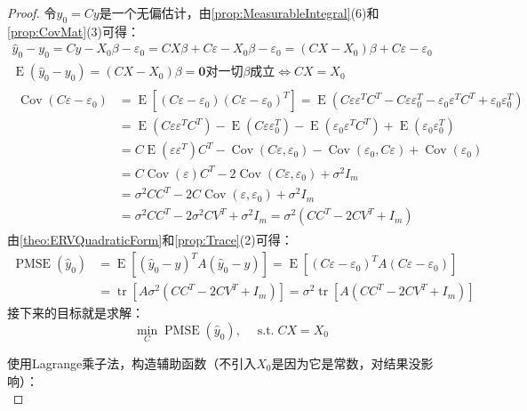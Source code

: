 \begin{proof}
	令$\hat{y}_0=Cy$是一个无偏估计，由\cref{prop:MeasurableIntegral}(6)和\cref{prop:CovMat}(3)可得：
	\begin{gather*}
		\hat{y}_0-y_0=Cy-X_0\beta-\varepsilon_0=CX\beta+C\varepsilon-X_0\beta-\varepsilon_0=(CX-X_0)\beta+C\varepsilon-\varepsilon_0 \\
		\operatorname{E}(\hat{y}_0-y_0)=(CX-X_0)\beta=\mathbf{0}\text{对一切$\beta$成立}\iff CX=X_0 \\
		\begin{aligned}
			\operatorname{Cov}(C\varepsilon-\varepsilon_0)&=\operatorname{E}[(C\varepsilon-\varepsilon_0)(C\varepsilon-\varepsilon_0)^T]=\operatorname{E}(C\varepsilon\varepsilon^TC^T-C\varepsilon\varepsilon_0^T-\varepsilon_0\varepsilon^TC^T+\varepsilon_0\varepsilon_0^T) \\
			&=\operatorname{E}(C\varepsilon\varepsilon^TC^T)-\operatorname{E}(C\varepsilon\varepsilon_0^T)-\operatorname{E}(\varepsilon_0\varepsilon^TC^T)+\operatorname{E}(\varepsilon_0\varepsilon_0^T) \\
			&=C\operatorname{E}(\varepsilon\varepsilon^T)C^T-\operatorname{Cov}(C\varepsilon,\varepsilon_0)-\operatorname{Cov}(\varepsilon_0,C\varepsilon)+\operatorname{Cov}(\varepsilon_0) \\
			&=C\operatorname{Cov}(\varepsilon)C^T-2\operatorname{Cov}(C\varepsilon,\varepsilon_0)+\sigma^2I_m \\
			&=\sigma^2CC^T-2C\operatorname{Cov}(\varepsilon,\varepsilon_0)+\sigma^2I_m \\
			&=\sigma^2CC^T-2\sigma^2CV^T+\sigma^2I_m=\sigma^2(CC^T-2CV^T+I_m)
		\end{aligned}
	\end{gather*}
	由\cref{theo:ERVQuadraticForm}和\cref{prop:Trace}(2)可得：
	\begin{align*}
		\operatorname{PMSE}(\hat{y}_0)&=\operatorname{E}[(\hat{y}_0-y)^TA(\hat{y}_0-y)] =\operatorname{E}[(C\varepsilon-\varepsilon_0)^TA(C\varepsilon-\varepsilon_0)] \\
		&=\operatorname{tr}[A\sigma^2(CC^T-2CV^T+I_m)] =\sigma^2\operatorname{tr}[A(CC^T-2CV^T+I_m)]
	\end{align*}
	接下来的目标就是求解：
	\begin{equation*}
		\min_{C}\operatorname{PMSE}(\hat{y}_0),\quad\operatorname{s.t.}CX=X_0
	\end{equation*}\par
	使用Lagrange乘子法，构造辅助函数（不引入$X_0$是因为它是常数，对结果没影响）：
	\begin{equation*}

\end{equation*}
\end{proof}
